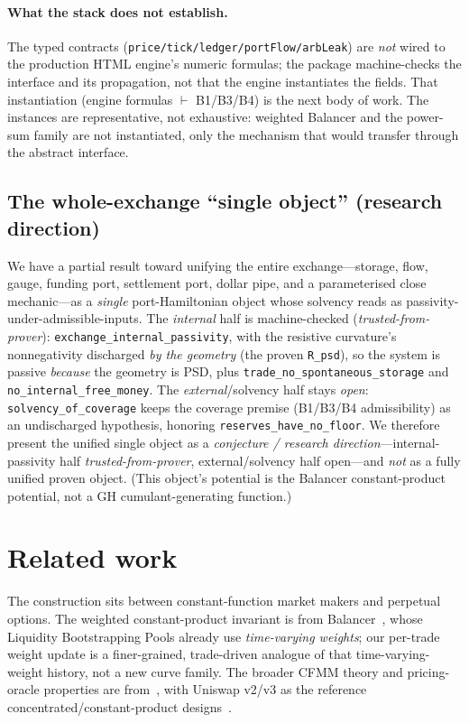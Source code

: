 \documentclass[11pt]{article}
\newcommand{\tfp}{\emph{trusted-from-prover}}
\begin{document}
\paragraph{What the stack does not establish.}
The typed contracts (\texttt{price/tick/ledger/portFlow/arbLeak}) are \emph{not}
wired to the production HTML engine's numeric formulas; the package machine-checks the
interface and its propagation, not that the engine instantiates the fields. That
instantiation (engine formulas $\vdash$ B1/B3/B4) is the next body of work. The
instances are representative, not exhaustive: weighted Balancer and the power-sum
family are not instantiated, only the mechanism that would transfer through the
abstract interface.

\subsection{The whole-exchange ``single object'' (research direction)}
We have a partial result toward unifying the entire exchange---storage, flow,
gauge, funding port, settlement port, dollar pipe, and a parameterised close
mechanic---as a \emph{single} port-Hamiltonian object whose solvency reads as
passivity-under-admissible-inputs. The \emph{internal} half is machine-checked
(\tfp{}): \texttt{exchange\_internal\_passivity}, with the resistive curvature's
nonnegativity discharged \emph{by the geometry} (the proven \texttt{R\_psd}), so
the system is passive \emph{because} the geometry is PSD, plus
\texttt{trade\_no\_spontaneous\_storage} and \texttt{no\_internal\_free\_money}.
The \emph{external}/solvency half stays \emph{open}: \texttt{solvency\_of\_coverage}
keeps the coverage premise (B1/B3/B4 admissibility) as an undischarged hypothesis,
honoring \texttt{reserves\_have\_no\_floor}. We therefore present the unified
single object as a \emph{conjecture / research direction}---internal-passivity
half \tfp{}, external/solvency half open---and \emph{not} as a fully unified proven
object. (This object's potential is the Balancer constant-product potential, not a
GH cumulant-generating function.)

\section{Related work}\label{sec:related}

The construction sits between constant-function market makers and perpetual
options. The weighted constant-product invariant is from Balancer~\cite{balancer},
whose Liquidity Bootstrapping Pools already use \emph{time-varying weights}; our
per-trade weight update is a finer-grained, trade-driven analogue of that
time-varying-weight history, not a new curve family. The broader CFMM theory and
pricing-oracle properties are from~\cite{angeris-cfmm,angeris-uniswap}, with
Uniswap v2/v3 as the reference concentrated/constant-product
designs~\cite{uniswapv2,uniswapv3}.
\end{document}

